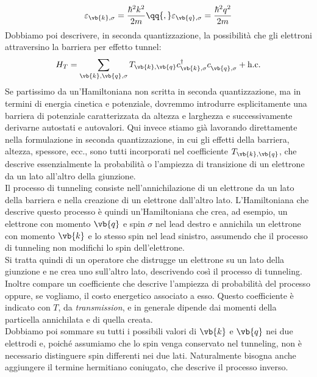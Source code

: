 \begin{equation*}
    \varepsilon_{\vb{k},\sigma}
    =\frac{\hbar^2 k^2}{2m}
    \qq{,}
    \varepsilon_{\vb{q},\sigma}
    =\frac{\hbar^2 q^2}{2m}
\end{equation*}
Dobbiamo poi descrivere, in seconda quantizzazione, la possibilità che gli elettroni attraversino la barriera per effetto tunnel:
\begin{equation*}
    H_T
    = \sum_{\vb{k}, \vb{q}, \sigma} T_{\vb{k}, \vb{q}} c^{\dag}_{\vb{k}, \sigma} c^{\vphantom{\dag}}_{\vb{q}, \sigma}
    + \text{h.c.}
\end{equation*}
Se partissimo da un'Hamiltoniana non scritta in seconda quantizzazione, ma in termini di energia cinetica e potenziale, dovremmo introdurre esplicitamente una barriera di potenziale caratterizzata da altezza e larghezza e successivamente derivarne autostati e autovalori. Qui invece stiamo già lavorando direttamente nella formulazione in seconda quantizzazione, in cui gli effetti della barriera, altezza, spessore, ecc., sono tutti incorporati nel coefficiente $T_{\vb{k},\vb{q}}$, che descrive essenzialmente la probabilità o l'ampiezza di transizione di un elettrone da un lato all'altro della giunzione.\\
Il processo di tunneling consiste nell'annichilazione di un elettrone da un lato della barriera e nella creazione di un elettrone dall'altro lato. L'Hamiltoniana che descrive questo processo è quindi un'Hamiltoniana che crea, ad esempio, un elettrone con momento $\vb{q}$ e spin $\sigma$ nel lead destro e annichila un elettrone con momento $\vb{k}$ e lo stesso spin nel lead sinistro, assumendo che il processo di tunneling non modifichi lo spin dell'elettrone.\\
Si tratta quindi di un operatore che distrugge un elettrone su un lato della giunzione e ne crea uno sull'altro lato, descrivendo così il processo di tunneling. Inoltre compare un coefficiente che descrive l'ampiezza di probabilità del processo oppure, se vogliamo, il costo energetico associato a esso. Questo coefficiente è indicato con $T$, da \textit{transmission}, e in generale dipende dai momenti della particella annichilata e di quella creata.\\
Dobbiamo poi sommare su tutti i possibili valori di $\vb{k}$ e $\vb{q}$ nei due elettrodi e, poiché assumiamo che lo spin venga conservato nel tunneling, non è necessario distinguere spin differenti nei due lati. Naturalmente bisogna anche aggiungere il termine hermitiano coniugato, che descrive il processo inverso.\\
